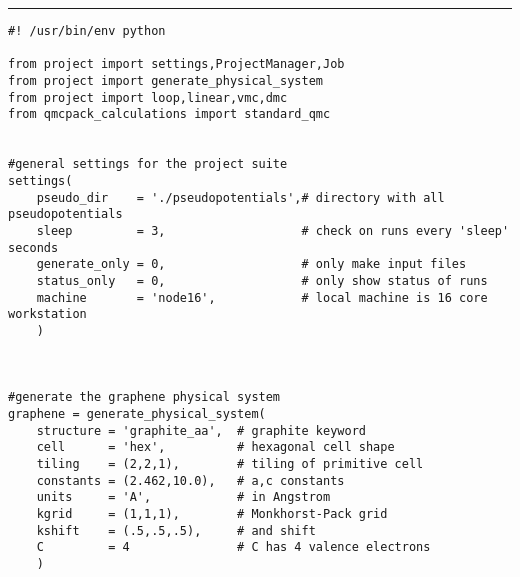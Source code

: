 \documentclass[oneside,11pt]{memoir}
\numberwithin{equation}{section}
\newcommand{\HRule}{\rule{\linewidth}{0.5mm}}
\begin{document}
\HRule
\begin{verbatim}
#! /usr/bin/env python

from project import settings,ProjectManager,Job
from project import generate_physical_system
from project import loop,linear,vmc,dmc
from qmcpack_calculations import standard_qmc


#general settings for the project suite
settings(
    pseudo_dir    = './pseudopotentials',# directory with all pseudopotentials
    sleep         = 3,                   # check on runs every 'sleep' seconds
    generate_only = 0,                   # only make input files
    status_only   = 0,                   # only show status of runs
    machine       = 'node16',            # local machine is 16 core workstation
    )



#generate the graphene physical system
graphene = generate_physical_system(
    structure = 'graphite_aa',  # graphite keyword
    cell      = 'hex',          # hexagonal cell shape
    tiling    = (2,2,1),        # tiling of primitive cell
    constants = (2.462,10.0),   # a,c constants
    units     = 'A',            # in Angstrom
    kgrid     = (1,1,1),        # Monkhorst-Pack grid
    kshift    = (.5,.5,.5),     # and shift
    C         = 4               # C has 4 valence electrons
    ) 



\end{verbatim}
\end{document}
